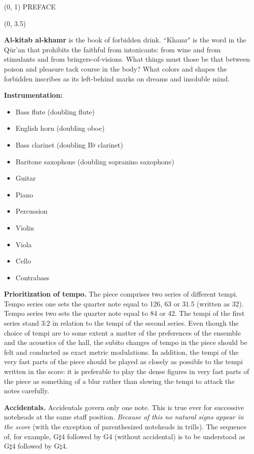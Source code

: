 \documentclass[10pt]{article}
\begin{document}
\begin{textblock}{23}(0, 1)
\center \huge PREFACE
\end{textblock}

\begin{textblock}{23}(0, 3.5)

\textbf{Al-kitab al-khamr} is the book of forbidden drink. ``Khamr" is the word
in the Q\={u}r'an that prohibits the faithful from intoxicants: from wine and
from stimulants and from bringers-of-visions. What things must those be that
between poison and pleasure tack course in the body? What colors and shapes the
forbidden inscribes as its left-behind marks on dreams and insoluble mind.

\textbf{Instrumentation:}

\begin{itemize} \itemsep2pt
\item Bass flute (doubling flute)
\item English horn (doubling oboe)
\item Bass clarinet (doubling B$\flat$ clarinet)
\item Baritone saxophone (doubling sopranino saxophone)
\item Guitar
\item Piano
\item Percussion
\item Violin
\item Viola
\item Cello
\item Contrabass
\end{itemize}


\textbf{Prioritization of tempo.} The piece comprises two series of different
tempi. Tempo series one sets the quarter note equal to 126, 63 or 31.5 (written
as 32). Tempo series two sets the quarter note equal to 84 or 42. The tempi of
the first series stand 3:2 in relation to the tempi of the second series.
Even though the choice of tempi are to some extent a matter of the preferences
of the ensemble and the acoustics of the hall, the subito changes of tempo in
the piece should be felt and conducted as exact metric modulations. In
addition, the tempi of the very fast parts of the piece should be played as
closely as possible to the tempi written in the score: it is preferable to play
the dense figures in very fast parts of the piece as something of a blur rather
than slowing the tempi to attack the notes carefully.

\textbf{Accidentals.} Accidentals govern only one note. This is true ever for
successive noteheads at the same staff position. \textit{Because of this no
natural signs appear in the score} (with the exception of parenthesized
noteheads in trills). The sequence of, for example, G$\sharp$4 followed by
G4 (without accidental) is to be understood as G$\sharp$4 followed by
G$\natural$4.


\end{textblock}
\end{document}
